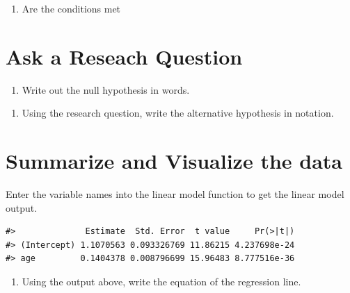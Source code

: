 \documentclass[
]{report}
\providecommand{\tightlist}{%
  \setlength{\itemsep}{0pt}\setlength{\parskip}{0pt}}
\begin{document}
\begin{enumerate}
\def\labelenumi{\arabic{enumi}.}
\setcounter{enumi}{4}
\tightlist
\item
  Are the conditions met
\end{enumerate}

\vspace{1in}

\hypertarget{ask-a-reseach-question}{%
\section{Ask a Reseach Question}\label{ask-a-reseach-question}}

\begin{enumerate}
\def\labelenumi{\arabic{enumi}.}
\setcounter{enumi}{5}
\tightlist
\item
  Write out the null hypothesis in words.
\end{enumerate}

\vspace{1in}

\begin{enumerate}
\def\labelenumi{\arabic{enumi}.}
\setcounter{enumi}{6}
\tightlist
\item
  Using the research question, write the alternative hypothesis in notation.
\end{enumerate}

\vspace{0.5in}

\hypertarget{summarize-and-visualize-the-data-3}{%
\section{Summarize and Visualize the data}\label{summarize-and-visualize-the-data-3}}

Enter the variable names into the linear model function to get the linear model output.

\begin{verbatim}
#>              Estimate  Std. Error  t value     Pr(>|t|)
#> (Intercept) 1.1070563 0.093326769 11.86215 4.237698e-24
#> age         0.1404378 0.008796699 15.96483 8.777516e-36
\end{verbatim}

\begin{enumerate}
\def\labelenumi{\arabic{enumi}.}
\setcounter{enumi}{7}
\tightlist
\item
  Using the output above, write the equation of the regression line.
\end{enumerate}
\end{document}
